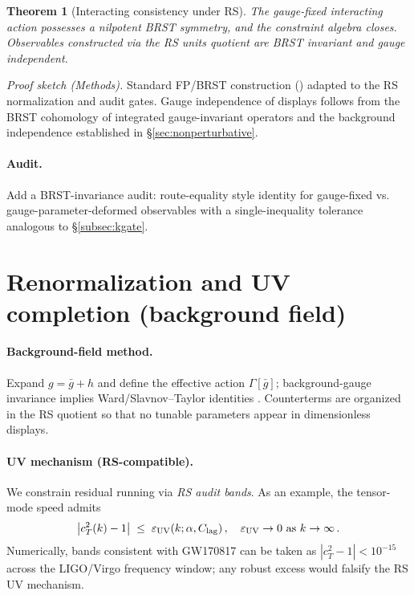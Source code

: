 \documentclass[11pt]{article}
\newtheorem{theorem}{Theorem}[section]
\begin{document}
\begin{theorem}[Interacting consistency under RS]
The gauge-fixed interacting action possesses a nilpotent BRST symmetry, and the constraint algebra closes. Observables constructed via the RS units quotient are BRST invariant and gauge independent.\end{theorem}

\noindent\emph{Proof sketch (Methods).} Standard FP/BRST construction (\cite{FaddeevPopov1967,BecchiRouetStora1976,Tyutin1975,Slavnov1972,Taylor1971}) adapted to the RS normalization and audit gates. Gauge independence of displays follows from the BRST cohomology of integrated gauge-invariant operators and the background independence established in \S\ref{sec:nonperturbative}.

\paragraph{Audit.} Add a BRST-invariance audit: route-equality style identity for gauge-fixed vs. gauge-parameter-deformed observables with a single-inequality tolerance analogous to \S\ref{subsec:kgate}.

\section{Renormalization and UV completion (background field)}
\label{sec:uv}

\paragraph{Background-field method.}
Expand $g=\bar g+h$ and define the effective action $\Gamma[\bar g]$; background-gauge invariance implies Ward/Slavnov--Taylor identities \cite{DeWitt1967,Abbott1981}. Counterterms are organized in the RS quotient so that no tunable parameters appear in dimensionless displays.

\paragraph{UV mechanism (RS-compatible).}
We constrain residual running via \emph{RS audit bands}. As an example, the tensor-mode speed admits
\[
\bigl|c_T^2(k)-1\bigr|\;\le\; \varepsilon_{\rm UV}(k;\alpha,C_{\rm lag})\,,\quad \varepsilon_{\rm UV}\to 0\ \text{as}\ k\to\infty\,.
\]
Numerically, bands consistent with GW170817 can be taken as $|c_T^2-1|<10^{-15}$ across the LIGO/Virgo frequency window; any robust excess would falsify the RS UV mechanism.
\end{document}

